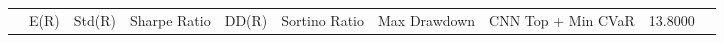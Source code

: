 \begin{tabular}{lrrrrrrrrr}
 & E(R) & Std(R) & Sharpe Ratio & DD(R) & Sortino Ratio & Max Drawdown & %
CNN Top + Min CVaR & 13.8000%
\end{tabular}
